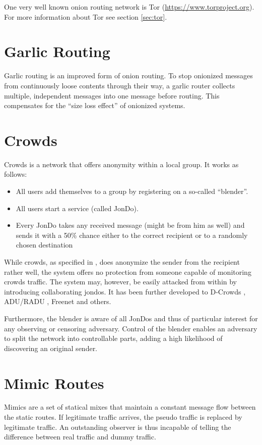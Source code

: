 One very well known onion routing network is Tor (\href{https://www.torproject.org}{https://www.torproject.org}). For more information about Tor see section \ref{sec:tor}.

\section{Garlic Routing}
Garlic routing is an improved form of onion routing. To stop onionized messages from continuously loose contents through their way, a garlic router collects multiple, independent messages into one message before routing. This compensates for the ``size loss effect'' of onionized systems.

\section{Crowds}
Crowds is a network that offers anonymity within a local group. It works as follows:

\begin{itemize}
	\item All users add themselves to a group by registering on a so-called ``blender''.
	\item All users start a service (called JonDo).
	\item Every JonDo takes any received message (might be from him as well) and sends it with a 50\% chance either to the correct recipient or to a randomly chosen destination
\end{itemize}

While crowds, as specified in \cite{crowds:tissec}, does anonymize the sender from the recipient rather well, the system offers no protection from someone capable of monitoring crowds traffic. The system may, however, be easily attacked from within by introducing collaborating jondos. It has been further developed to D-Crowds \cite{crowdsAttack}, ADU/RADU \cite{Munoz-Gea2008}, Freenet\cite{freenet} and others. 

Furthermore, the blender is aware of all JonDos and thus of particular interest for any observing or censoring adversary. Control of the blender enables an adversary to split the network into controllable parts, adding a high likelihood of discovering an original sender.

\section{Mimic Routes}
Mimics are a set of statical mixes that maintain a constant message flow between the static routes. If legitimate traffic arrives, the pseudo traffic is replaced by legitimate traffic. An outstanding observer is thus incapable of telling the difference between real traffic and dummy traffic.

